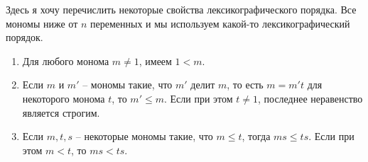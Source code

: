 \begin{remarks}
Здесь я хочу перечислить некоторые свойства лексикографического порядка.
Все мономы ниже от $n$ переменных и мы используем какой-то лексикографический порядок.
\begin{enumerate}
\item Для любого монома $m\neq 1$, имеем $1 < m$.

\item Если $m$ и $m'$ -- мономы такие, что $m'$ делит $m$, то есть $m = m' t$ для некоторого монома $t$, то $m' \leqslant m$.
Если при этом $t\neq 1$, последнее неравенство является строгим.

\item Если $m, t, s$ -- некоторые мономы такие, что $m \leqslant t$, тогда $ms \leqslant ts$.
Если при этом $m < t$, то $ms < ts$.
\end{enumerate}
\end{remarks}



